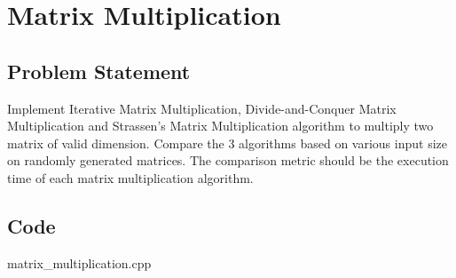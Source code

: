 \section{Matrix Multiplication}
\subsection{Problem Statement}
Implement Iterative Matrix Multiplication, Divide-and-Conquer Matrix Multiplication and Strassen's Matrix Multiplication algorithm to multiply two matrix of valid dimension. 
Compare the 3 algorithms based on various input size on randomly generated matrices.  The comparison metric should be the execution time of each matrix multiplication algorithm.
\subsection{Code}
\begin{code}
    \caption{matrix\_multiplication.cpp}
    \label{code:matmul}
\end{code}
